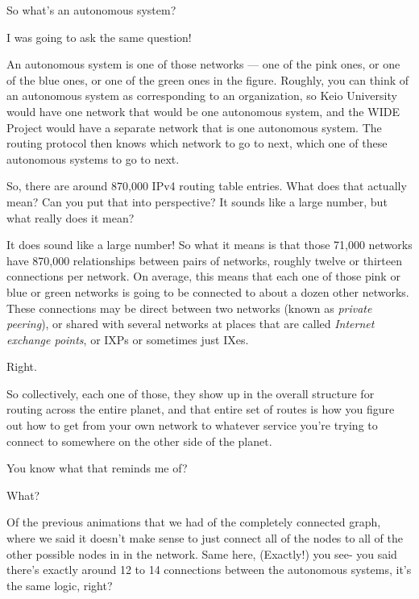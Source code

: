 \rrr So what's an autonomous system?

\mmm I was going to ask the same question!

\rrr An autonomous system is one of those networks --- one of the pink ones, or one of the blue ones, or one of the green ones in the figure. Roughly, you can think of an autonomous system as corresponding to an organization, so Keio University would have one network that would be one autonomous system, and the WIDE Project would have a separate network that is one autonomous system. The routing protocol then knows which network to go to next, which one of these autonomous systems to go to next.

\mmm So, there are around 870,000 IPv4 routing table entries. What does that actually mean? Can you put that into perspective? It sounds like a large number, but what really does it mean?

\rrr It does sound like a large number! So what it means is that those 71,000 networks have 870,000 relationships between pairs of networks, roughly twelve or thirteen connections per network. On average, this means that each one of those pink or blue or green networks is going to be connected to about a dozen other networks. These connections may be direct between two networks (known as \emph{private peering}), or shared with several networks at places that are called \emph{Internet exchange points}, or IXPs or sometimes just IXes.

\mmm Right.

\rrr So collectively, each one of those, they show up in the overall structure for routing across the entire planet, and that entire set of routes is how you figure out how to get from your own network to whatever service you're trying to connect to somewhere on the other side of the planet.

\mmm You know what that reminds me of? 

\rrr What?

\mmm Of the previous animations that we had of the completely connected graph, where we said it doesn't make sense to just connect all of the nodes to all of the other possible nodes in in the network. Same here, (Exactly!) you see- you said there's exactly around 12 to 14 connections between the autonomous systems, it's the same logic, right?

